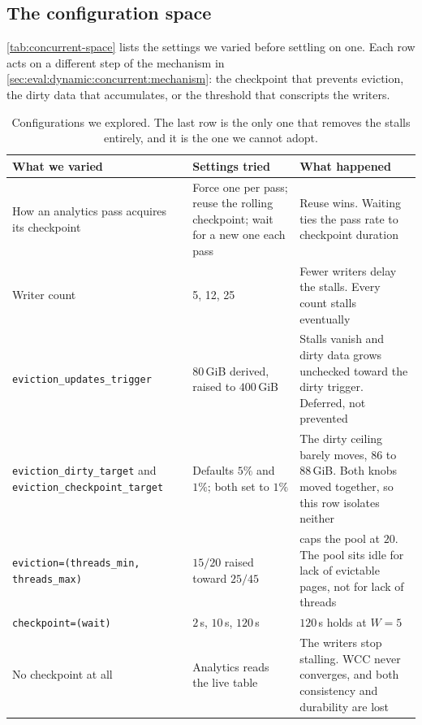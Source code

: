 \subsection{The configuration space}
\label{sec:eval:dynamic:concurrent:space}

\autoref{tab:concurrent-space} lists the settings we varied before settling on one.
Each row acts on a different step of the mechanism in \autoref{sec:eval:dynamic:concurrent:mechanism}: the checkpoint that prevents eviction, the dirty data that accumulates, or the threshold that conscripts the writers.

\begin{table}[t]
  \centering
  \setlength{\tabcolsep}{4pt}\renewcommand{\arraystretch}{1.05}
  \footnotesize
  \begin{tabular}{>{\raggedright}p{} >{\raggedright}p{} >{\raggedright\arraybackslash}p{}}
  \toprule
  What we varied & Settings tried & What happened \\
  \midrule
  How an analytics pass acquires its checkpoint & Force one per pass; reuse the rolling checkpoint; wait for a new one each pass & Reuse wins. Waiting ties the pass rate to checkpoint duration \\
  Writer count & 5, 12, 25 & Fewer writers delay the stalls. Every count stalls eventually \\
  \texttt{eviction\_updates\_trigger} & $80$\,GiB derived, raised to $400$\,GiB & Stalls vanish and dirty data grows unchecked toward the dirty trigger. Deferred, not prevented \\
  \texttt{eviction\_dirty\_target} and \texttt{eviction\_checkpoint\_target} & Defaults $5\%$ and $1\%$; both set to $1\%$ & The dirty ceiling barely moves, $86$ to $88$\,GiB. Both knobs moved together, so this row isolates neither \\
  \texttt{eviction=(threads\_min, threads\_max)} & $15/20$ raised toward $25/45$ & \wt{} caps the pool at $20$. The pool sits idle for lack of evictable pages, not for lack of threads \\
  \texttt{checkpoint=(wait)} & $2$\,s, $10$\,s, $120$\,s & $120$\,s holds at $W=5$ \\
  No checkpoint at all & Analytics reads the live table & The writers stop stalling. WCC never converges, and both consistency and durability are lost \\
  \bottomrule
  \end{tabular}
  \caption{Configurations we explored.
  The last row is the only one that removes the stalls entirely, and it is the one we cannot adopt.}
  \label{tab:concurrent-space}
\end{table}

